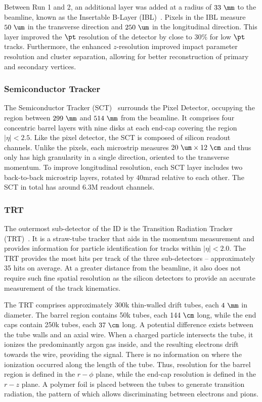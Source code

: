 Between Run 1 and 2, an additional layer was added at a radius of $33~\mm$ to the beamline, known as the Insertable B-Layer (IBL)~\cite{ATLASIBL}.
Pixels in the IBL measure $50~\um$ in the transverse direction and $250~\um$ in the longitudinal direction.
This layer improved the $\pt$ resolution of the detector by close to 30\% for low $\pt$ tracks.
Furthermore, the enhanced $z$-resolution improved impact parameter resolution and cluster separation, allowing for better reconstruction of primary and secondary vertices.

\subsubsection{Semiconductor Tracker}

The Semiconductor Tracker (SCT)~\cite{ATLASSCT} surrounds the Pixel Detector, occupying the region between $299~\mm$ and $514~\mm$ from the beamline.
It comprises four concentric barrel layers with nine disks at each end-cap covering the region $|\eta| < 2.5$.
Like the pixel detector, the SCT is composed of silicon readout channels. Unlike the pixels, each microstrip measures $20~\um \times 12~\cm$ and thus only has high granularity in a single direction, oriented to the transverse momentum.
To improve longitudinal resolution, each SCT layer includes two back-to-back microstrip layers, rotated by $40 \unit{\milli\radian}$ relative to each other.
The SCT in total has around 6.3M readout channels.

\subsubsection{TRT}

The outermost sub-detector of the ID is the Transition Radiation Tracker (TRT)~\cite{ATLASTRT}.
It is a straw-tube tracker that aids in the momentum measurement and provides information for particle identification for tracks within $|\eta| < 2.0$.
The TRT provides the most hits per track of the three sub-detectors -- approximately 35 hits on average.
At a greater distance from the beamline, it also does not require such fine spatial resolution as the silicon detectors to provide an accurate measurement of the track kinematics.

The TRT comprises approximately 300k thin-walled drift tubes, each $4~\mm$ in diameter.
The barrel region contains 50k tubes, each $144~\cm$ long, while the end caps contain 250k tubes, each $37~\cm$ long.
A potential difference exists between the tube walls and an axial wire.
When a charged particle intersects the tube, it ionizes the predominantly argon gas inside, and the resulting electrons drift towards the wire, providing the signal.
There is no information on where the ionization occurred along the length of the tube.
Thus, resolution for the barrel region is defined in the $r-\phi$ plane, while the end-cap resolution is defined in the $r-z$ plane.
A polymer foil is placed between the tubes to generate transition radiation, the pattern of which allows discriminating between electrons and pions.

